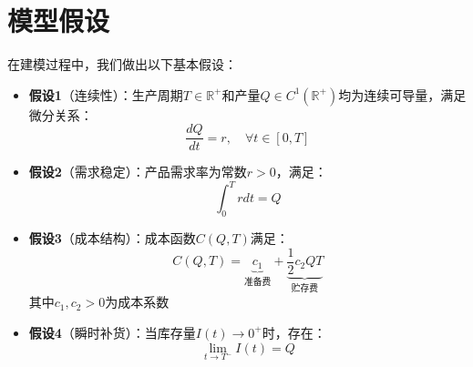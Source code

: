 \section{模型假设}\label{sec:Premise}

在建模过程中，我们做出以下基本假设：

\begin{itemize}
    \item \textbf{假设1}（连续性）：生产周期$T \in \mathbb{R}^+$和产量$Q \in C^1(\mathbb{R}^+)$均为连续可导量，满足微分关系：
        \[
        \frac{dQ}{dt} = r,\quad \forall t \in [0,T]
        \]
    
    \item \textbf{假设2}（需求稳定）：产品需求率为常数$r > 0$，满足：
        \[
        \int_{0}^{T} r dt = Q
        \]
    
    \item \textbf{假设3}（成本结构）：成本函数$C(Q,T)$满足：
        \[
        C(Q,T) = \underbrace{c_1}_{\text{准备费}} + \underbrace{\frac{1}{2}c_2 Q T}_{\text{贮存费}}
        \]
        其中$c_1,c_2 > 0$为成本系数
    
    \item \textbf{假设4}（瞬时补货）：当库存量$I(t) \to 0^+$时，存在：
        \[
        \lim_{t\to T^-} I(t) = Q
        \]
\end{itemize}
